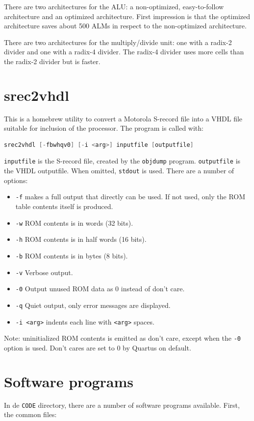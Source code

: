 \documentclass[12pt]{article}
\begin{document}
There are two architectures for the ALU: a non-optimized, easy-to-follow architecture and an optimized architecture. First impression is that the optimized architecture saves about 500 ALMs in respect to the non-optimized architecture.

There are two architectures for the multiply/divide unit: one with a radix-2 divider and one with a radix-4 divider. The radix-4 divider uses more cells than the radix-2 divider but is faster.

\section{srec2vhdl}
This is a homebrew utility to convert a Motorola S-record file into a VHDL file suitable for inclusion of the processor. The program is called with:

\begin{lstlisting}[language=c]
srec2vhdl [-fbwhqv0] [-i <arg>] inputfile [outputfile]
\end{lstlisting}

\texttt{inputfile} is the S-record file, created by the \texttt{objdump} program. \texttt{outputfile} is the VHDL outputfile. When omitted, \texttt{stdout} is used. There are a number of options:

\begin{itemize}
\item \texttt{-f} makes a full output that directly can be used. If not used, only the ROM table contents itself is produced.
\item \texttt{-w} ROM contents is in words (32 bits).
\item \texttt{-h} ROM contents is in half words (16 bits).
\item \texttt{-b} ROM contents is in bytes (8 bits).
\item \texttt{-v} Verbose output.
\item \texttt{-0} Output unused ROM data as 0 instead of don't care.
\item \texttt{-q} Quiet output, only error messages are displayed.
\item \texttt{-i <arg>} indents each line with \texttt{<arg>} spaces.
\end{itemize}

Note: uninitialized ROM contents is emitted as don't care, except when the \texttt{-0} option is used. Don't cares are set to 0 by Quartus on default.

\section{Software programs}
In de \texttt{CODE} directory, there are a number of software programs available. First, the common files:
\end{document}
